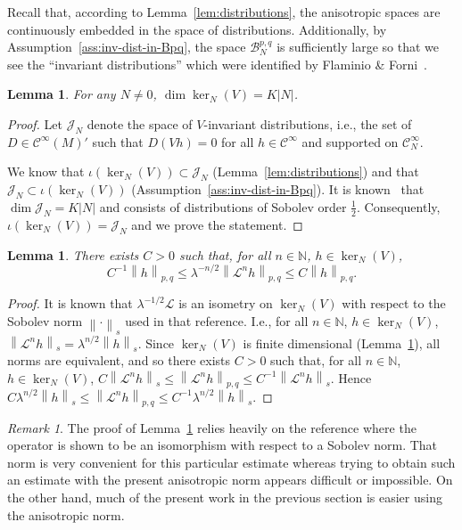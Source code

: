 \documentclass[a4paper,11pt]{amsart}
\newtheorem{lemma}[theorem]{Lemma}
\theoremstyle{remark}
\newtheorem{remark}[theorem]{Remark}
\newcommand{\abs}[1]{\left|#1\right|} %
\newcommand{\cB}{\mathcal{B}} %
\newcommand{\cC}{\mathcal{C}} %
\newcommand{\cJ}{\mathcal{J}} %
\newcommand{\cL}{\mathcal{L}} %
\newcommand{\bN}{\mathbb{N}} %
\newcommand{\norm}[1]{\left\|#1\right\|} %
\newcommand{\dv}{V} %
\begin{document}
Recall that, according to Lemma~\ref{lem:distributions}, the anisotropic spaces are continuously embedded in the space of distributions.
Additionally, by Assumption~\ref{ass:inv-dist-in-Bpq}, 
the space \(\cB_{N}^{p,q}\) is sufficiently large so that we see the ``invariant distributions'' which were identified by Flaminio \& Forni~\cite{FF06}.

\begin{lemma}
    \label{lem:dim-IN}
    For any $N \neq 0$, 
    \(\dim\ker_N(\dv) = K\abs{N}\). 
\end{lemma}

\begin{proof}
    Let \(\cJ_N\) denote the space of \(\dv\)-invariant distributions, i.e., the set of \(D \in \cC^\infty(M)'\) such that \(D(\dv h) = 0\) for all \(h \in \cC^\infty\) and supported on \(\cC^\infty_N\).
    
    We know  that \(\iota (\ker_N(\dv)) \subset \cJ_N\) (Lemma~\ref{lem:distributions}) and that  \(\cJ_N \subset \iota (\ker_N(\dv))\) (Assumption~\ref{ass:inv-dist-in-Bpq}). It is known~\cite[Proposition 4.4]{FF06} that \(\dim\cJ_N = K\abs{N} \) and consists of distributions of Sobolev order \(\frac{1}{2}\).
    Consequently, \(\iota (\ker_N(\dv)) = \cJ_N\) and we prove the statement.
\end{proof}

\begin{lemma}
    \label{lem:bounded}
    There exists \(C > 0\) such that, for all \(n\in \bN\), \(h \in \ker_N(\dv)\),
    \[
        C^{-1} \norm{h}_{p,q} \leq \lambda^{-n/2}\norm{\cL^n h}_{p,q} \leq C \norm{h}_{p,q}.
    \]
\end{lemma}

\begin{proof}
    It is known \cite[Proposition 4.8]{FF06} that \(\lambda^{-1/2} \cL\) is an isometry on \(\ker_N(\dv)\) with respect to the Sobolev norm \(\norm{\cdot}_{s}\) used in that reference.
    I.e., for all \(n\in \bN\), \(h \in \ker_N(\dv)\), \(\norm{\cL^n h}_{s} = \lambda^{n/2}\norm{h}_{s}\).
    Since \(\ker_N(\dv)\) is finite dimensional (Lemma~\ref{lem:dim-IN}), all norms are equivalent, and so there exists \(C>0\) such that, for all \(n\in \bN\), \(h \in \ker_N(\dv)\), \(C \norm{\cL^n h}_{s} \leq  \norm{\cL^n h}_{p,q} \leq C^{-1} \norm{\cL^n h}_{s}\).
    Hence \(C \lambda^{n/2} \norm{h}_{s} \leq  \norm{\cL^n h}_{p,q} \leq C^{-1} \lambda^{n/2}  \norm{h}_{s}\).
\end{proof}

\begin{remark}
    \label{rem:norm-choice}
    The proof of Lemma~\ref{lem:bounded} relies heavily on the reference where the operator is shown to be an isomorphism with respect to a Sobolev norm.
    That norm is very convenient for this particular estimate whereas trying to obtain such an estimate with the present anisotropic norm appears difficult or impossible.
    On the other hand, much of the present work in the previous section is easier using the anisotropic norm.
\end{remark}
\end{document}
